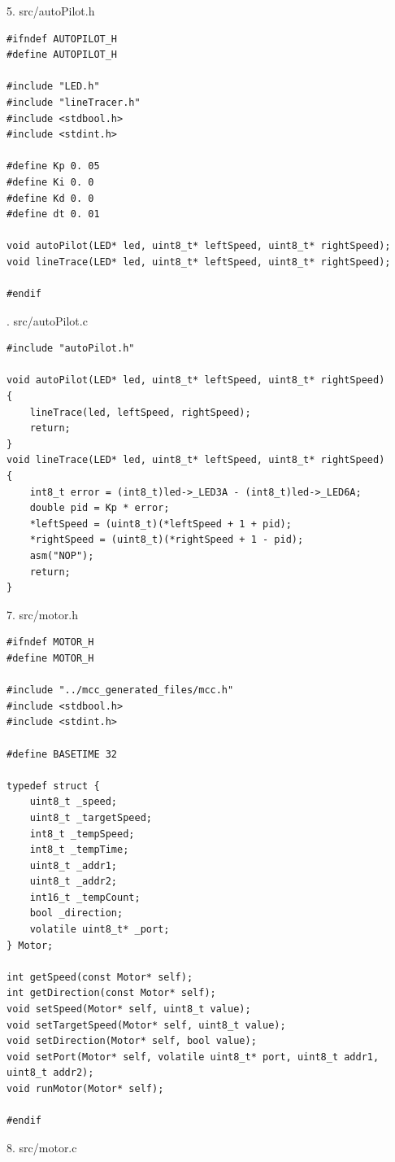 \documentclass[
]{ltjarticle}
\begin{document}
5. src/autoPilot.h
\begin{verbatim}
#ifndef AUTOPILOT_H
#define AUTOPILOT_H

#include "LED.h"
#include "lineTracer.h"
#include <stdbool.h>
#include <stdint.h>

#define Kp 0. 05
#define Ki 0. 0
#define Kd 0. 0
#define dt 0. 01

void autoPilot(LED* led, uint8_t* leftSpeed, uint8_t* rightSpeed);
void lineTrace(LED* led, uint8_t* leftSpeed, uint8_t* rightSpeed);

#endif
\end{verbatim}
. src/autoPilot.c
\begin{verbatim}
#include "autoPilot.h"

void autoPilot(LED* led, uint8_t* leftSpeed, uint8_t* rightSpeed)
{
    lineTrace(led, leftSpeed, rightSpeed);
    return;
}
void lineTrace(LED* led, uint8_t* leftSpeed, uint8_t* rightSpeed)
{
    int8_t error = (int8_t)led->_LED3A - (int8_t)led->_LED6A;
    double pid = Kp * error;
    *leftSpeed = (uint8_t)(*leftSpeed + 1 + pid);
    *rightSpeed = (uint8_t)(*rightSpeed + 1 - pid);
    asm("NOP");
    return;
}
\end{verbatim}
7. src/motor.h
\begin{verbatim}
#ifndef MOTOR_H
#define MOTOR_H

#include "../mcc_generated_files/mcc.h"
#include <stdbool.h>
#include <stdint.h>

#define BASETIME 32

typedef struct {
    uint8_t _speed;
    uint8_t _targetSpeed;
    int8_t _tempSpeed;
    int8_t _tempTime;
    uint8_t _addr1;
    uint8_t _addr2;
    int16_t _tempCount;
    bool _direction;
    volatile uint8_t* _port;
} Motor;

int getSpeed(const Motor* self);
int getDirection(const Motor* self);
void setSpeed(Motor* self, uint8_t value);
void setTargetSpeed(Motor* self, uint8_t value);
void setDirection(Motor* self, bool value);
void setPort(Motor* self, volatile uint8_t* port, uint8_t addr1, uint8_t addr2);
void runMotor(Motor* self);

#endif
\end{verbatim}
8. src/motor.c
\end{document}
